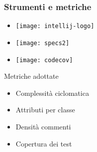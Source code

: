 \begin{frame}
\frametitle{Strumenti e metriche}
\begin{minipage}[c]{.45\textwidth}
\begin{itemize}
\item[] \texttt{[image: intellij-logo]}
\item[] \texttt{[image: specs2]}
\item[] \texttt{[image: codecov]}
\end{itemize}
\end{minipage}
\begin{minipage}[c]{.45\textwidth}
Metriche adottate
\begin{itemize}
\item Complessità ciclomatica
\item Attributi per classe
\item Densità commenti
\item Copertura dei test
\end{itemize}
\end{minipage}


\end{frame}